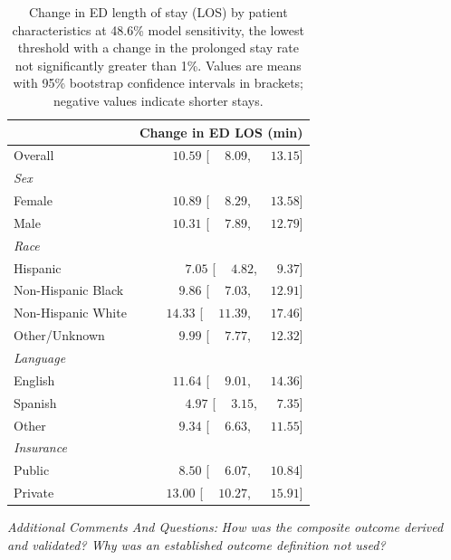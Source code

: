  \begin{table}[htbp]
\centering
\small
\caption{Change in ED length of stay (LOS) by patient characteristics at 48.6\% model sensitivity, the lowest threshold with a change in the prolonged stay rate not significantly greater than 1\%. Values are means with 95\% bootstrap confidence intervals in brackets; negative values indicate shorter stays.}
\label{tab:los_demographics_0.01}
\begin{tabular}{lr}
\toprule
 & Change in ED LOS (min) \\
\midrule
Overall & $\phantom{-}10.59$ [$\phantom{-}8.09$, $\phantom{-}13.15$] \\
\addlinespace
{\textit{Sex}} & \\
\quad Female & $\phantom{-}10.89$ [$\phantom{-}8.29$, $\phantom{-}13.58$] \\
\quad Male & $\phantom{-}10.31$ [$\phantom{-}7.89$, $\phantom{-}12.79$] \\
\addlinespace
{\textit{Race}} & \\
\quad Hispanic & $\phantom{-}7.05$ [$\phantom{-}4.82$, $\phantom{-}9.37$] \\
\quad Non-Hispanic Black & $\phantom{-}9.86$ [$\phantom{-}7.03$, $\phantom{-}12.91$] \\
\quad Non-Hispanic White & $\phantom{-}14.33$ [$\phantom{-}11.39$, $\phantom{-}17.46$] \\
\quad Other/Unknown & $\phantom{-}9.99$ [$\phantom{-}7.77$, $\phantom{-}12.32$] \\
\addlinespace
{\textit{Language}} & \\
\quad English & $\phantom{-}11.64$ [$\phantom{-}9.01$, $\phantom{-}14.36$] \\
\quad Spanish & $\phantom{-}4.97$ [$\phantom{-}3.15$, $\phantom{-}7.35$] \\
\quad Other & $\phantom{-}9.34$ [$\phantom{-}6.63$, $\phantom{-}11.55$] \\
\addlinespace
{\textit{Insurance}} & \\
\quad Public & $\phantom{-}8.50$ [$\phantom{-}6.07$, $\phantom{-}10.84$] \\
\quad Private & $\phantom{-}13.00$ [$\phantom{-}10.27$, $\phantom{-}15.91$] \\
\bottomrule
\end{tabular}
\end{table}


\textit{ Additional Comments And Questions:}
\textit{     How was the composite outcome derived and validated? Why was an established outcome definition not used?}


